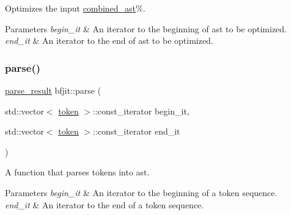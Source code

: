 Optimizes the input \hyperlink{namespacebfjit_ad9bbdb76861e57928b1bc7695c2c0623}{combined\+\_\+ast}\%. 


\begin{DoxyParams}{Parameters}
{\em begin\+\_\+it} & An iterator to the beginning of ast to be optimized. \\
\hline
{\em end\+\_\+it} & An iterator to the end of ast to be optimized. \\
\hline
\end{DoxyParams}
\hypertarget{namespacebfjit_add88f8f5cb8f1e6fe6d1ab62b2d5b9b4}{}\label{namespacebfjit_add88f8f5cb8f1e6fe6d1ab62b2d5b9b4} 
\subsubsection{\texorpdfstring{parse()}{parse()}}
{\footnotesize\ttfamily \hyperlink{namespacebfjit_ac770ef0753b4d7d6bd5800262ba97f25}{parse\+\_\+result} bfjit\+::parse (\begin{DoxyParamCaption}\item[{std\+::vector$<$ \hyperlink{classbfjit_1_1token}{token} $>$\+::const\+\_\+iterator}]{begin\+\_\+it,  }\item[{std\+::vector$<$ \hyperlink{classbfjit_1_1token}{token} $>$\+::const\+\_\+iterator}]{end\+\_\+it }\end{DoxyParamCaption})}



A function that parses tokens into ast. 


\begin{DoxyParams}{Parameters}
{\em begin\+\_\+it} & An iterator to the beginning of a token sequence. \\
\hline
{\em end\+\_\+it} & An iterator to the end of a token sequence. \\
\hline
\end{DoxyParams}
